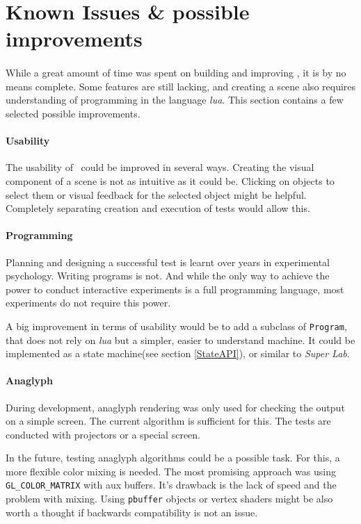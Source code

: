 \section{Known Issues \& possible improvements\label{Issues}}
\paragraph{}
While a great amount of time was spent on building and improving \ER, it is by no means complete.
Some features are still lacking, and creating a scene also requires understanding of programming in the language \textit{lua}.
This section contains a few selected possible improvements.

\paragraph{Usability}
The usability of \ER\ could be improved in several ways.
Creating the visual component of a scene is not as intuitive as it could be.
Clicking on objects to select them or visual feedback for the selected object might be helpful.
Completely separating creation and execution of tests would allow this.

\paragraph{Programming}
Planning and designing a successful test is learnt over years in experimental psychology.
Writing programs is not.
And while the only way to achieve the power to conduct interactive experiments is a full programming language, most experiments do not require this power.

A big improvement in terms of usability would be to add a subclass of \lstinline{Program}, that does not rely on \textit{lua} but a simpler, easier to understand machine.
It could be implemented as a state machine(see section \ref{StateAPI}), or similar to \textit{Super Lab}\cite{superlab}.

\paragraph{Anaglyph}
During development, anaglyph rendering was only used for checking the output on a simple screen.
The current algorithm is sufficient for this.
The tests are conducted with projectors or a special screen.

In the future, testing anaglyph algorithms could be a possible task.
For this, a more flexible color mixing is needed.
The most promising approach was using \lstinline{GL_COLOR_MATRIX} with aux buffers.
It's drawback is the lack of speed and the problem with mixing.
Using \lstinline{pbuffer} objects or vertex shaders might be also worth a thought if backwards compatibility is not an issue.

